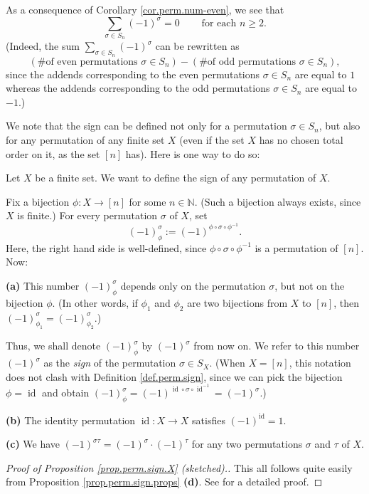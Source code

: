 As a consequence of Corollary \ref{cor.perm.num-even}, we see that%
\begin{equation}
\sum_{\sigma\in S_{n}}\left(  -1\right)  ^{\sigma}%
=0\ \ \ \ \ \ \ \ \ \ \text{for each }n\geq2.
\label{eq.cor.perm.num-even.sum-sign}%
\end{equation}
(Indeed, the sum $\sum_{\sigma\in S_{n}}\left(  -1\right)  ^{\sigma}$ can be
rewritten as
\[
\left(  \text{\# of even permutations }\sigma\in S_{n}\right)  -\left(
\text{\# of odd permutations }\sigma\in S_{n}\right)  ,
\]
since the addends corresponding to the even permutations $\sigma\in S_{n}$ are
equal to $1$ whereas the addends corresponding to the odd permutations
$\sigma\in S_{n}$ are equal to $-1$.)

We note that the sign can be defined not only for a permutation $\sigma\in
S_{n}$, but also for any permutation of any finite set $X$ (even if the set
$X$ has no chosen total order on it, as the set $\left[  n\right]  $ has).
Here is one way to do so:

\begin{proposition}
\label{prop.perm.sign.X}Let $X$ be a finite set. We want to define the sign of
any permutation of $X$.

Fix a bijection $\phi:X\rightarrow\left[  n\right]  $ for some $n\in
\mathbb{N}$. (Such a bijection always exists, since $X$ is finite.) For every
permutation $\sigma$ of $X$, set%
\[
\left(  -1\right)  _{\phi}^{\sigma}:=\left(  -1\right)  ^{\phi\circ\sigma
\circ\phi^{-1}}.
\]
Here, the right hand side is well-defined, since $\phi\circ\sigma\circ
\phi^{-1}$ is a permutation of $\left[  n\right]  $. Now: \medskip

\textbf{(a)} This number $\left(  -1\right)  _{\phi}^{\sigma}$ depends only on
the permutation $\sigma$, but not on the bijection $\phi$. (In other words, if
$\phi_{1}$ and $\phi_{2}$ are two bijections from $X$ to $\left[  n\right]  $,
then $\left(  -1\right)  _{\phi_{1}}^{\sigma}=\left(  -1\right)  _{\phi_{2}%
}^{\sigma}$.)

Thus, we shall denote $\left(  -1\right)  _{\phi}^{\sigma}$ by $\left(
-1\right)  ^{\sigma}$ from now on. We refer to this number $\left(  -1\right)
^{\sigma}$ as the \emph{sign} of the permutation $\sigma\in S_{X}$. (When
$X=\left[  n\right]  $, this notation does not clash with Definition
\ref{def.perm.sign}, since we can pick the bijection $\phi=\operatorname*{id}$
and obtain $\left(  -1\right)  _{\phi}^{\sigma}=\left(  -1\right)
^{\operatorname*{id}\circ\sigma\circ\operatorname*{id}\nolimits^{-1}}=\left(
-1\right)  ^{\sigma}$.) \medskip

\textbf{(b)} The identity permutation $\operatorname*{id}:X\rightarrow X$
satisfies $\left(  -1\right)  ^{\operatorname*{id}}=1$. \medskip

\textbf{(c)} We have $\left(  -1\right)  ^{\sigma\tau}=\left(  -1\right)
^{\sigma}\cdot\left(  -1\right)  ^{\tau}$ for any two permutations $\sigma$
and $\tau$ of $X$.
\end{proposition}

\begin{proof}
[Proof of Proposition \ref{prop.perm.sign.X} (sketched).]This all follows
quite easily from Proposition \ref{prop.perm.sign.props} \textbf{(d)}. See
\cite[Exercise 5.12]{detnotes} for a detailed proof.
\end{proof}
